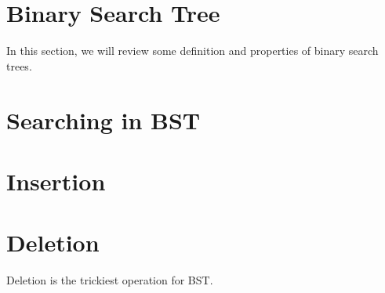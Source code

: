 \section{Binary Search Tree}

In this section, we will review some definition and properties of binary search trees.

\section{Searching in BST}

\section{Insertion}

\section{Deletion}

Deletion is the trickiest operation for BST.